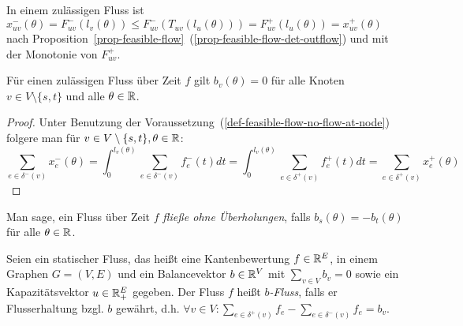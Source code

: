 \begin{remark}\label{remark-x^-leqx^+}
	In einem zulässigen Fluss ist $x_{uv}^-(\theta) = F_{uv}^-(l_v(\theta)) \leq F_{uv}^-(T_{uv}(l_u(\theta)))=F_{uv}^+(l_u(\theta)) = x_{uv}^+(\theta)$
	 nach Proposition~\ref{prop-feasible-flow}~(\ref{prop-feasible-flow-det-outflow}) und mit der Monotonie von $F_{uv}^+$.
\end{remark}

\begin{lemma}\label{lemma-balance-0}
	Für einen zulässigen Fluss über Zeit $f$ gilt $b_v(\theta)=0$ für alle Knoten $v\in V\setminus\{ s,t \}$ und alle $\theta\in\mathbb{R}$.
\end{lemma}
\begin{proof}
	Unter Benutzung der Voraussetzung~(\ref{def-feasible-flow-no-flow-at-node}) folgere man für $v\in V\setminus \{ s, t\}, \theta\in\mathbb{R}$:
	$$\sum_{e\in\delta^-(v)} x_e^-(\theta) = \int_{0}^{l_v(\theta)} \sum_{e\in\delta^-(v)} f_e^-(t) dt = \int_{0}^{l_v(\theta)} \sum_{e\in\delta^+(v)} f_e^+(t) dt = \sum_{e\in\delta^+(v)}x_e^+(\theta)$$
\end{proof}

\begin{definition}
	Man sage, ein Fluss über Zeit $f$ \emph{fließe ohne Überholungen}, falls $b_s(\theta) = -b_t(\theta)$ für alle $\theta\in\mathbb{R}$.
\end{definition}


\begin{definition}
	Seien ein statischer Fluss, das heißt eine Kantenbewertung $f \in \mathbb{R}^E$, in einem Graphen $G=(V,E)$ und ein Balancevektor $b\in\mathbb{R}^V$ mit $\sum_{v\in V} b_v = 0$ sowie ein Kapazitätsvektor $u\in\mathbb{R}_+^E$ gegeben.
	Der Fluss $f$ heißt \emph{$b$-Fluss}, falls er Flusserhaltung bzgl. $b$ gewährt, d.h. $\forall v\in V: \sum_{e\in\delta^+(v)}f_e - \sum_{e\in\delta^-(v)}f_e = b_v$.
\end{definition}


